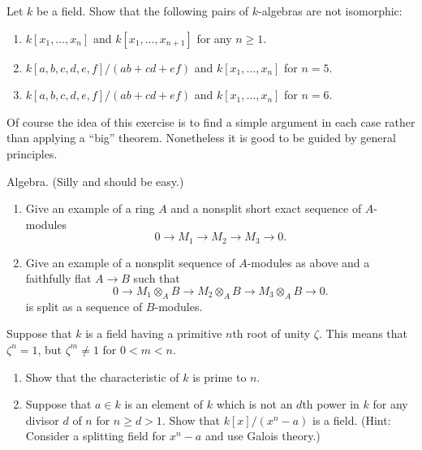 \begin{exercise}
\label{exercise-not-isomorphic}
Let $k$ be a field. Show that the following pairs of
$k$-algebras are not isomorphic:
\begin{enumerate}
\item $k[x_1, \ldots, x_n]$ and $k[x_1, \ldots, x_{n + 1}]$ for any
$n\geq 1$.
\item $k[a, b, c, d, e, f]/(ab + cd + ef)$ and $k[x_1, \ldots, x_n]$
for $n = 5$.
\item $k[a, b, c, d, e, f]/(ab + cd + ef)$ and $k[x_1, \ldots, x_n]$
for $n = 6$.
\end{enumerate}
\end{exercise}

\begin{remark}
\label{remark-simple-geometric}
Of course the idea of this exercise is to find
a simple argument in each case rather than applying a ``big'' theorem.
Nonetheless it is good to be guided by general principles.
\end{remark}

\begin{exercise}
\label{exercise-silly}
Algebra. (Silly and should be easy.)
\begin{enumerate}
\item Give an example of a ring $A$ and a nonsplit
short exact sequence of $A$-modules
$$
0 \to M_1 \to M_2 \to M_3 \to 0.
$$
\item Give an example of a nonsplit sequence of $A$-modules
as above and a faithfully flat $A \to B$ such that
$$
0 \to M_1\otimes_A B \to M_2\otimes_A B \to M_3\otimes_A B \to 0.
$$
is split as a sequence of $B$-modules.
\end{enumerate}
\end{exercise}

\begin{exercise}
\label{exercise-field-kummer}
Suppose that $k$ is a field having a primitive $n$th root
of unity $\zeta$. This means that $\zeta^n = 1$, but $\zeta^m\not = 1$ for
$0 < m < n$.
\begin{enumerate}
\item Show that the characteristic of $k$ is prime to $n$.
\item Suppose that $a \in k$ is an element of $k$ which is not
an $d$th power in $k$ for any divisor $d$ of $n$ for $n \geq d > 1$. Show that
$k[x]/(x^n-a)$ is a field. (Hint: Consider a splitting field for
$x^n-a$ and use Galois theory.)
\end{enumerate}
\end{exercise}

